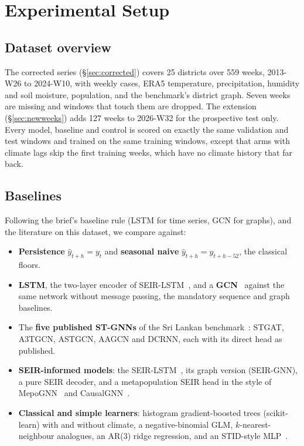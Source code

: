 \section{Experimental Setup}
\label{sec:setup}

\subsection{Dataset overview}
The corrected series (\S\ref{sec:corrected}) covers 25 districts over 559 weeks,
2013-W26 to 2024-W10, with weekly cases, ERA5 temperature, precipitation, humidity
and soil moisture, population, and the benchmark's district graph. Seven weeks are
missing and windows that touch them are dropped. The extension (\S\ref{sec:newweeks})
adds 127 weeks to 2026-W32 for the prospective test only. 
Every model, baseline and control is scored on exactly the same validation and test
windows and trained on the same training windows, except that arms with climate lags
skip the first training weeks, which have no climate history that far back.

\subsection{Baselines}
\label{sec:baselines}
Following the brief's baseline rule (LSTM for time series, GCN for graphs), and the
literature on this dataset, we compare against:
\begin{itemize}\itemsep1pt
\item \textbf{Persistence} $\hat y_{t+h}=y_t$ and \textbf{seasonal naive}
      $\hat y_{t+h}=y_{t+h-52}$, the classical floors.
\item \textbf{LSTM}, the two-layer encoder of SEIR-LSTM~\cite{liu2025seirlstm}, and
      a \textbf{GCN}~\cite{kipf2017gcn} against the same network without message
      passing, the mandatory sequence and graph baselines.
\item The \textbf{five published ST-GNNs} of the Sri Lankan benchmark~\cite{weng2024graph}:
      STGAT, A3TGCN, ASTGCN, AAGCN and DCRNN, each with its direct head as published.
\item \textbf{SEIR-informed models}: the SEIR-LSTM~\cite{liu2025seirlstm}, its graph
      version (SEIR-GNN), a pure SEIR decoder, and a metapopulation SEIR head in the
      style of MepoGNN~\cite{cao2023mepognn} and CausalGNN~\cite{wang2022causalgnn}.
\item \textbf{Classical and simple learners}: histogram gradient-boosted trees (scikit-learn)
      with and without climate, a negative-binomial GLM, $k$-nearest-neighbour
      analogues, an AR(3) ridge regression, and an STID-style MLP~\cite{shao2022stid}.
\end{itemize}

